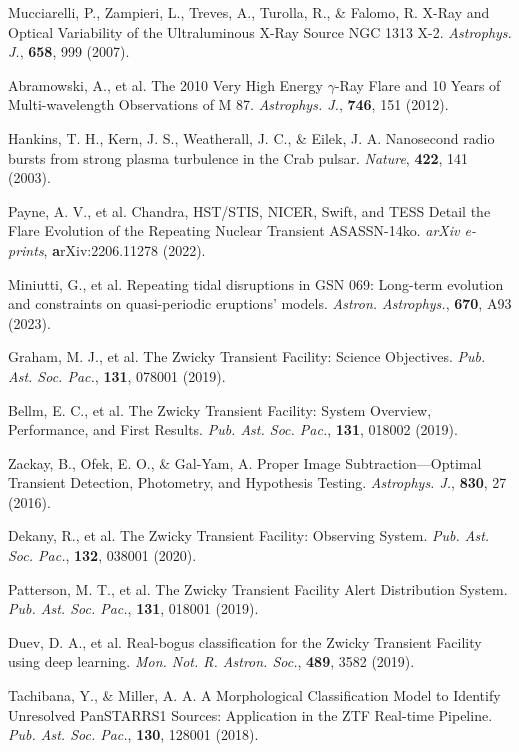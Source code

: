 \documentclass{nature_plusfigure}
\newcommand{\mn}{{Mon. Not. R. Astron. Soc.}}
\newcommand{\mnras}{\mn}
\newcommand{\apj}{{Astrophys. J.}}
\newcommand{\aap}{{Astron. Astrophys.}}
\newcommand{\nat}{{Nature}}
\newcommand{\pasp}{{Pub. Ast. Soc. Pac.}}
\begin{document}
\begin{methods}
\begin{thebibliography}{10}
 
 Mucciarelli, P., Zampieri, L., Treves, A., Turolla, R., \& Falomo, R. X-Ray and Optical Variability of the Ultraluminous X-Ray Source NGC 1313 X-2. \emph{\apj}, \textbf{658}, 999 (2007). 

 Abramowski, A., et al. The 2010 Very High Energy $\gamma$-Ray Flare and 10 Years of Multi-wavelength Observations of M 87. \emph{\apj}, \textbf{746}, 151 (2012). 

 Hankins, T. H., Kern, J. S., Weatherall, J. C., \& Eilek, J. A. Nanosecond radio bursts from strong plasma turbulence in the Crab pulsar. \emph{\nat}, \textbf{422}, 141 (2003). 

 Payne, A. V., et al. Chandra, HST/STIS, NICER, Swift, and TESS Detail the Flare Evolution of the Repeating Nuclear Transient ASASSN-14ko. \emph{arXiv e-prints}, \textbf arXiv:2206.11278 (2022). 

 Miniutti, G., et al. Repeating tidal disruptions in GSN 069: Long-term evolution and constraints on quasi-periodic eruptions' models. \emph{\aap}, \textbf{670}, A93 (2023). 



 Graham, M. J., et al. The Zwicky Transient Facility: Science Objectives. \emph{\pasp}, \textbf{131}, 078001 (2019). 

 Bellm, E. C., et al. The Zwicky Transient Facility: System Overview, Performance, and First Results. \emph{\pasp}, \textbf{131}, 018002 (2019). 

 Zackay, B., Ofek, E. O., \& Gal-Yam, A. Proper Image Subtraction—Optimal Transient Detection, Photometry, and Hypothesis Testing. \emph{\apj}, \textbf{830}, 27 (2016). 

 Dekany, R., et al. The Zwicky Transient Facility: Observing System. \emph{\pasp}, \textbf{132}, 038001 (2020). 

 Patterson, M. T., et al. The Zwicky Transient Facility Alert Distribution System. \emph{\pasp}, \textbf{131}, 018001 (2019). 

  Duev, D. A., et al. Real-bogus classification for the Zwicky Transient Facility using deep learning. \emph{\mnras}, \textbf{489}, 3582 (2019). 

 Tachibana, Y., \& Miller, A. A. A Morphological Classification Model to Identify Unresolved PanSTARRS1 Sources: Application in the ZTF Real-time Pipeline. \emph{\pasp}, \textbf{130}, 128001 (2018). 


\end{thebibliography}
\end{methods}
\end{document}
